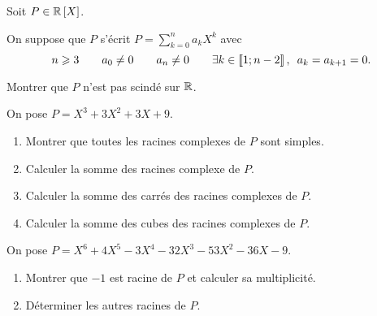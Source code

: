 \begin{exo}
Soit \(P\in\poly[\R]\).

On suppose que \(P\) s'écrit \(P=\sum_{k=0}^na_kX^k\) avec \[n\geq3\qquad a_0\not=0\qquad a_n\not=0\qquad\quantifs{\exists k\in\interventierii{1}{n-2}}a_k=a_{k+1}=0.\]

Montrer que \(P\) n'est pas scindé sur \(\mathbb{R}\).
\end{exo}

\begin{corr}
\end{corr}

\begin{exo}[Exercice 18]
On pose \(P=X^3+3X^2+3X+9\).

\begin{enumerate}
\item Montrer que toutes les racines complexes de \(P\) sont simples. \\

\item Calculer la somme des racines complexe de \(P\). \\

\item Calculer la somme des carrés des racines complexes de \(P\). \\

\item Calculer la somme des cubes des racines complexes de \(P\).
\end{enumerate}
\end{exo}

\begin{corr}
\end{corr}

\begin{exo}[Exercice 19]
On pose \(P=X^6+4X^5-3X^4-32X^3-53X^2-36X-9\).

\begin{enumerate}
\item Montrer que \(-1\) est racine de \(P\) et calculer sa multiplicité. \\

\item Déterminer les autres racines de \(P\).
\end{enumerate}
\end{exo}

\begin{corr}
\end{corr}

